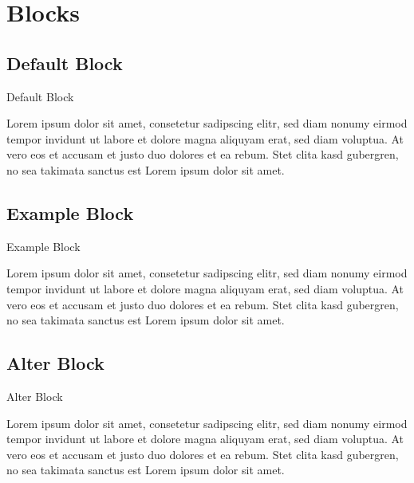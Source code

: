 \section{Blocks}
\label{sec:blocks}

\subsection{Default Block}
\label{sub:default_block}

\begin{frame}
	\begin{block}{Default Block}

		Lorem ipsum dolor sit amet, consetetur sadipscing elitr, sed diam nonumy eirmod
		tempor invidunt ut labore et dolore magna aliquyam erat, sed diam voluptua. At
		vero eos et accusam et justo duo dolores et ea rebum. Stet clita kasd gubergren,
		no sea takimata sanctus est Lorem ipsum dolor sit amet.

	\end{block}
\end{frame}

\subsection{Example Block}
\label{sub:example_block}

\begin{frame}
	\begin{exampleblock}{Example Block}

Lorem ipsum dolor sit amet, consetetur sadipscing elitr, sed diam nonumy eirmod
tempor invidunt ut labore et dolore magna aliquyam erat, sed diam voluptua. At
vero eos et accusam et justo duo dolores et ea rebum. Stet clita kasd gubergren,
no sea takimata sanctus est Lorem ipsum dolor sit amet.

	\end{exampleblock}
\end{frame}

\subsection{Alter Block}
\label{sub:alter_block}

\begin{frame}
	\begin{alertblock}{Alter Block}

Lorem ipsum dolor sit amet, consetetur sadipscing elitr, sed diam nonumy eirmod
tempor invidunt ut labore et dolore magna aliquyam erat, sed diam voluptua. At
vero eos et accusam et justo duo dolores et ea rebum. Stet clita kasd gubergren,
no sea takimata sanctus est Lorem ipsum dolor sit amet.

	\end{alertblock}
\end{frame}

